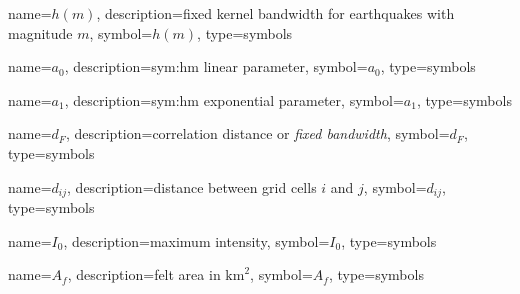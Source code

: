 {
	name={\ensuremath{h(m)}},
	description={fixed kernel bandwidth for earthquakes with magnitude $m$}, 
	symbol={\ensuremath{h(m)}}, 
	type=symbols
}



{
	name={\ensuremath{a_0}},
	description={\gls{sym:hm} linear parameter}, 
	symbol={\ensuremath{a_0}}, 
	type=symbols
}



{
	name={\ensuremath{a_1}},
	description={\gls{sym:hm} exponential parameter}, 
	symbol={\ensuremath{a_1}}, 
	type=symbols
}




{
	name={\ensuremath{d_F}},
	description={correlation distance or \emph{fixed bandwidth}}, 
	symbol={\ensuremath{d_F}}, 
	type=symbols
}


{
	name={\ensuremath{d_{ij}}},
	description={distance between grid cells $i$ and $j$}, 
	symbol={\ensuremath{d_{ij}}}, 
	type=symbols
}


{
	name={\ensuremath{I_0}},
	description={maximum intensity}, 
	symbol={\ensuremath{I_0}}, 
	type=symbols
}


{
	name={\ensuremath{A_{f}}},
	description={felt area in $\text{km}^2$}, 
	symbol={\ensuremath{A_{f}}}, 
	type=symbols
}



